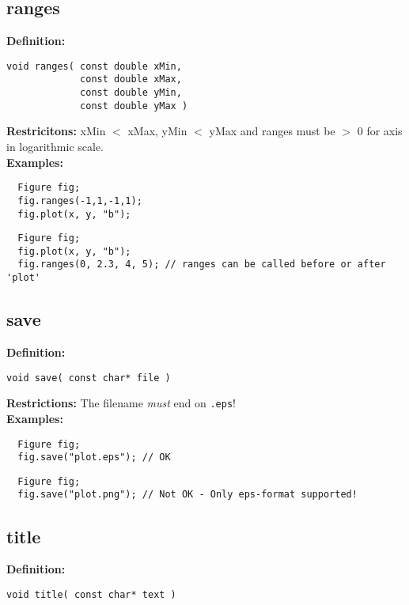 \documentclass[a4paper]{article}
\newcommand{\command}[1]{\subsection{#1}}
\begin{document}
\command{ranges}

\textbf{Definition:}
\begin{lstlisting}
void ranges( const double xMin, 
             const double xMax, 
             const double yMin, 
             const double yMax )
\end{lstlisting}
%
\textbf{Restricitons:} xMin $<$ xMax, yMin $<$ yMax and ranges must be $>$ 0 for axis in logarithmic scale. \\
%
\textbf{Examples:}
\begin{lstlisting}
  Figure fig;
  fig.ranges(-1,1,-1,1);
  fig.plot(x, y, "b");
\end{lstlisting}
\begin{lstlisting}
  Figure fig;
  fig.plot(x, y, "b");
  fig.ranges(0, 2.3, 4, 5); // ranges can be called before or after 'plot'
\end{lstlisting}

\command{save}

\textbf{Definition:}
\begin{lstlisting}
void save( const char* file )
\end{lstlisting}
%
\textbf{Restrictions:} The filename \textit{must} end on \texttt{.eps}! \\
%
\textbf{Examples:}
\begin{lstlisting}
  Figure fig;
  fig.save("plot.eps"); // OK
\end{lstlisting}
\begin{lstlisting}
  Figure fig;
  fig.save("plot.png"); // Not OK - Only eps-format supported!
\end{lstlisting}

\command{title}

\textbf{Definition:}
\begin{lstlisting}
void title( const char* text )
\end{lstlisting}
\end{document}

